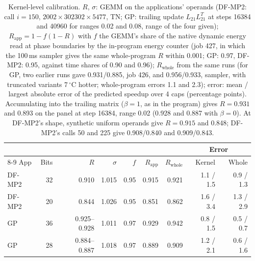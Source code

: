\documentclass[conference]{IEEEtran}
\begin{document}
\begin{table}[t]
\caption{Kernel-level calibration. $R$, $\sigma$: GEMM on the applications' operands (DF-MP2: call $i=150$, $2002\times
302302\times5477$, TN; GP: trailing update $L_{21}L_{21}^T$ at steps 16384 and 40960 for ranges 0.02 and 0.08, range of
the four given); $R_\mathrm{app}=1-f(1-R)$ with $f$ the GEMM's share of the native dynamic energy read at phase boundaries by the in-program energy counter (job 427, in which the 100\,ms sampler gives the same whole-program $R$ within 0.001; GP: 0.97, DF-MP2: 0.95, against time shares of 0.90 and 0.96); $R_\mathrm{whole}$ from the same runs (for GP, two earlier runs gave 0.931/0.885, job 426, and 0.956/0.933, sampler, with truncated variants 7\,$^\circ$C hotter; whole-program errors 1.1 and 2.3); error: mean / largest absolute error of the predicted speedup over 4 caps
(percentage points). Accumulating into the trailing matrix ($\beta=1$, as in the program) gives $R=0.931$ and 0.893 on
the panel at step 16384, range 0.02 (0.928 and 0.887 with $\beta=0$). At DF-MP2's shape, synthetic uniform operands give
$R=0.915$ and 0.848; DF-MP2's calls 50 and 225 give 0.908/0.840 and 0.909/0.843.}\label{tab:kcal}
\centering\footnotesize\setlength{\tabcolsep}{2.5pt}
\begin{tabular}{@{}lrrrrrrrr@{}}
\toprule
& & & & & & & \multicolumn{2}{c}{Error} \\
\cmidrule(l){8-9}
App & Bits & $R$ & $\sigma$ & $f$ & $R_\mathrm{app}$ & $R_\mathrm{whole}$ & Kernel & Whole \\
\midrule
DF-MP2 & 32 & 0.910 & 1.015 & 0.95 & 0.915 & 0.921 & 1.1 / 1.5 & 0.9 / 1.3 \\
DF-MP2 & 20 & 0.844 & 1.026 & 0.95 & 0.851 & 0.862 & 1.6 / 3.4 & 1.3 / 2.9 \\
GP & 36 & 0.925--0.928 & 1.011 & 0.97 & 0.929 & 0.942 & 0.8 / 1.5 & 0.5 / 0.7 \\
GP & 28 & 0.884--0.887 & 1.018 & 0.97 & 0.889 & 0.909 & 1.2 / 2.1 & 0.6 / 1.6 \\
\bottomrule
\end{tabular}
\end{table}
\end{document}
